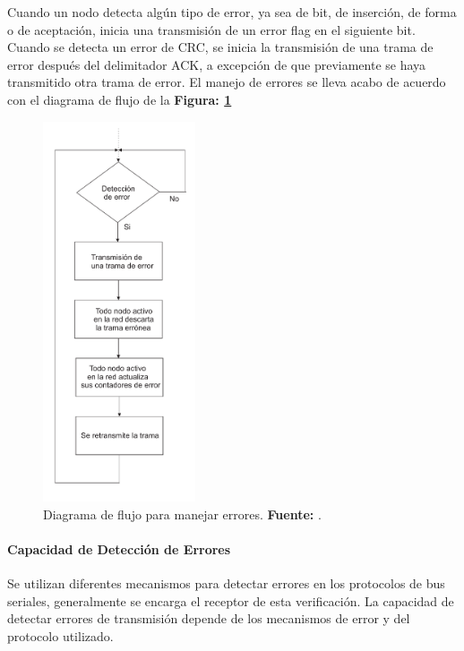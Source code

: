 Cuando un nodo detecta algún tipo de error, ya sea de bit, de inserción, de forma o de aceptación, inicia una transmisión de un error flag en el siguiente bit. Cuando se detecta un error de CRC, se inicia la transmisión de una trama de error después del delimitador ACK, a excepción de que previamente se haya transmitido otra trama de error.
El manejo de errores se lleva acabo de acuerdo con el diagrama de flujo de la \textbf {Figura: \ref{D_F}}
\begin{figure}[H]
	\centering
		\includegraphics[width=0.40\textwidth]{./Cap2imagen/diagrama.pdf}
	\caption[Diagrama de flujo para manejar errores.]{Diagrama de flujo para manejar errores.\textbf{ Fuente:} \cite{DSEEPC}.}
	\label{D_F} %
\end{figure}

\paragraph{Capacidad de Detección de Errores}

Se utilizan diferentes mecanismos para detectar errores en los protocolos de bus seriales, generalmente se encarga el receptor de esta verificación. La capacidad de detectar errores de transmisión depende de los mecanismos de error y del protocolo utilizado.





